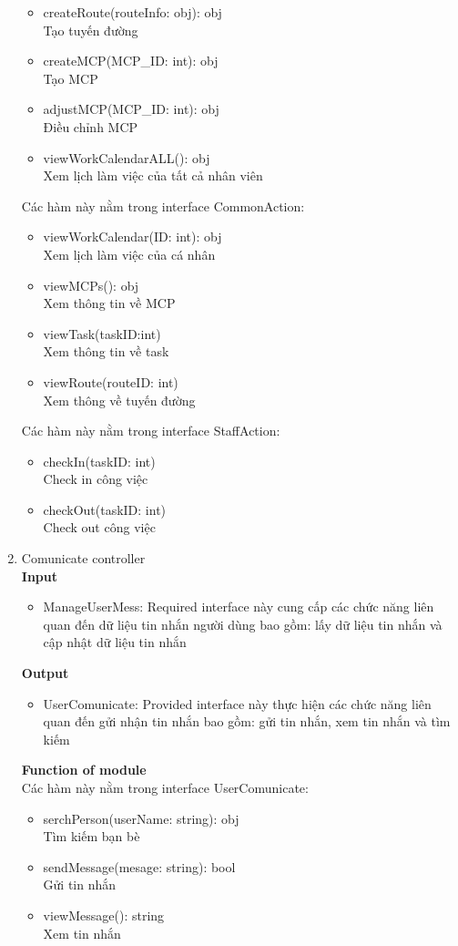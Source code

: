 \documentclass[a4paper]{article}
\begin{document}
\begin{enumerate}
\begin{itemize}
\item createRoute(routeInfo: obj): obj
\\ Tạo tuyến đường
\item createMCP(MCP\_ID: int): obj
\\ Tạo MCP
\item adjustMCP(MCP\_ID: int): obj
\\ Điều chỉnh MCP
\item viewWorkCalendarALL(): obj
\\ Xem lịch làm việc của tất cả nhân viên
 \end{itemize}
   Các hàm này nằm trong interface CommonAction:
     \begin{itemize}
 \item viewWorkCalendar(ID: int): obj
 \\ Xem lịch làm việc của cá nhân
\item  viewMCPs(): obj
\\ Xem thông tin về MCP
\item  viewTask(taskID:int)
\\ Xem thông tin về task
\item  viewRoute(routeID: int)
\\ Xem thông về tuyến đường
 \end{itemize}
   Các hàm này nằm trong interface StaffAction:
     \begin{itemize}
\item checkIn(taskID: int)
\\ Check in công việc
\item checkOut(taskID: int)
\\ Check out công việc
 \end{itemize}
 
 
         \item Comunicate controller \\
 \textbf{Input}
 \begin{itemize}
     \item ManageUserMess: Required interface này cung cấp các chức năng liên quan đến dữ liệu tin nhắn người dùng bao gồm: lấy dữ liệu tin nhắn và cập nhật dữ liệu tin nhắn
 \end{itemize}
  \textbf{Output}
   \begin{itemize}
     \item UserComunicate: Provided interface này thực hiện các chức năng liên quan đến gửi nhận tin
nhắn bao gồm: gửi tin nhắn, xem tin nhắn và tìm kiếm
 \end{itemize}
  \textbf{Function of module}\\
  Các hàm này nằm trong interface UserComunicate:
     \begin{itemize}
\item serchPerson(userName: string): obj
\\ Tìm kiếm bạn bè
\item sendMessage(mesage: string): bool
\\ Gửi tin nhắn
\item viewMessage(): string
\\ Xem tin nhắn
 \end{itemize}
 

\end{enumerate}
\end{document}
